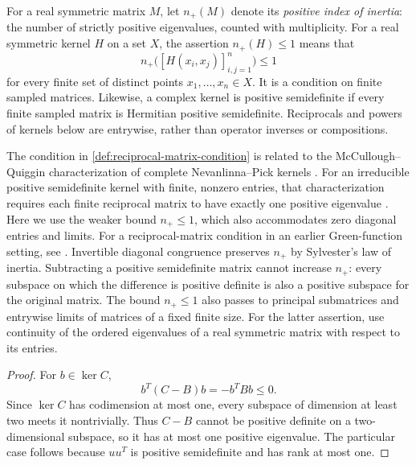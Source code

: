 For a real symmetric matrix $M$, let $n_+(M)$ denote its
\emph{positive index of inertia}: the number of strictly positive
eigenvalues, counted with multiplicity. For a real symmetric kernel $H$
on a set $X$, the assertion $n_+(H)\le1$ means that
\[
 n_+\bigl([H(x_i,x_j)]_{i,j=1}^n\bigr)\le1
\]
for every finite set of distinct points $x_1,\ldots,x_n\in X$.
It is a condition on finite sampled matrices. Likewise, a complex
kernel is positive semidefinite if every finite sampled matrix is
Hermitian positive semidefinite. Reciprocals and powers of kernels
below are entrywise, rather than operator inverses or compositions.


The condition in \cref{def:reciprocal-matrix-condition} is related to the
McCullough--Quiggin characterization of complete Nevanlinna--Pick
kernels \cite{McC94,Qui94}. For an irreducible positive semidefinite kernel with finite,
nonzero entries, that characterization requires each finite reciprocal
matrix to have exactly one positive eigenvalue
\cite[Corollary 1.12]{AglerMcCarthy}. Here we use the weaker bound
$n_+\le1$, which also accommodates zero diagonal entries and limits.
For a reciprocal-matrix condition in an earlier Green-function setting,
see \cite[Section 2.2, Corollary 2.2.2 and Theorem 2.2.3]{Qui94}.
Invertible diagonal congruence preserves $n_+$ by Sylvester's law of
inertia. Subtracting a positive semidefinite matrix cannot increase
$n_+$: every subspace on which the difference is positive definite
is also a positive subspace for the original matrix. The bound
$n_+\le1$ also passes to principal submatrices and entrywise limits
of matrices of a fixed finite size.
For the latter assertion, use continuity of the ordered eigenvalues
of a real symmetric matrix with respect to its entries.

\begin{proof}
For $b\in\ker C$,
\[
 b^T(C-B)b=-b^TBb\le0.
\]
Since $\ker C$ has codimension at most one, every subspace of
dimension at least two meets it nontrivially. Thus $C-B$ cannot be
positive definite on a two-dimensional subspace, so it has at most
one positive eigenvalue. The particular case follows because
$uu^T$ is positive semidefinite and has rank at most one.
\end{proof}

